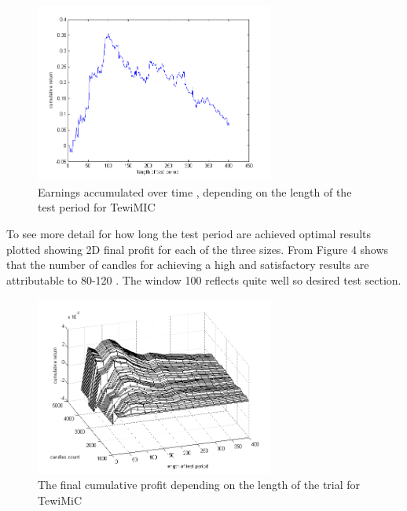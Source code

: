 \documentclass{tewiart}
\begin{document}
\begin{figure}[h!]
\begin{center}
\includegraphics[width=0.7\textwidth]{pictures/mic_end.png}
\caption{Earnings accumulated over time , depending on the length of the test period for TewiMIC}
\label{Cum3DMiCend}
\end{center}
\end{figure}
\FloatBarrier
To see more detail for how long the test period are achieved optimal results plotted showing 2D final profit for each of the three sizes.
 From Figure 4 shows that the number of candles for achieving a high and satisfactory results are attributable to 80-120 .
 The window 100 reflects quite well so desired test section.\\

\begin{figure}[h!]
\begin{center}
\includegraphics[width=0.7\textwidth]{pictures/cumulativeReturnsPerCandleC.png}
\caption{The final cumulative profit depending on the length of the trial for TewiMiC}
\label{Cum3DPerCMiC}
\end{center}
\end{figure}
\FloatBarrier
\end{document}
